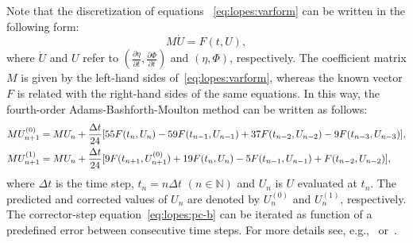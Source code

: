   Note that the discretization of equations
  ~\eqref{eq:lopes:varform} can be written in the following
  form:
\begin{equation}
M\dot U=F(t,U),
\end{equation}
where $\dot U$ and $U$ refer to $\displaystyle
\left(\frac{\partial \eta}{\partial t},\frac{\partial \Phi}{\partial t}\right)$ and
$(\eta,\Phi)$, respectively.  The coefficient matrix $M$ is
given by the left-hand sides of~\eqref{eq:lopes:varform},
whereas the known vector $F$ is related with the right-hand
sides of the same equations.  In this way, the fourth-order
Adams-Bashforth-Moulton method can be written as follows:
\begin{subequations}\label{eq:lopes:pc}
\begin{align}
&\displaystyle MU^{(0)}_{n+1}=MU_n+\frac{\Delta
    t}{24}[55{F}(t_n,U_n)-59{F}(t_{n-1},U_{n-1})+37{F}(t_{n-2},U_{n-2})-9{F}(t_{n-3},U_{n-3})],
\vspace{0.3cm} \label{eq:lopes:pc-a}\\ \displaystyle
&MU^{(1)}_{n+1}=MU_n+\frac{\Delta
  t}{24}[9{F}(t_{n+1},U^{(0)}_{n+1})+19{F}(t_n,U_n)-5{F}(t_{n-1},U_{n-1})+{F}(t_{n-2},U_{n-2})],\label{eq:lopes:pc-b}
\end{align}
\end{subequations}
where $\Delta t$ is the time step, $t_n=n\Delta t$ $(n\in
\mathbb{N})$ and $U_n$ is $U$ evaluated at $t_n$.  The
predicted and corrected values of $U_n$ are denoted by
$U_n^{(0)}$ and $U_n^{(1)}$, respectively.  The
corrector-step equation~\eqref{eq:lopes:pc-b} can be
iterated as function of a predefined error between
consecutive time steps.  For more details see,
e.g.,~\cite{HairerWanner1991a} or~\cite{Lambert1991}.

